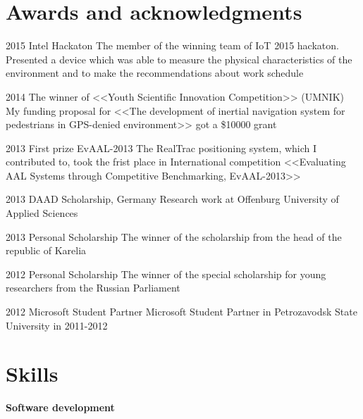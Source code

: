 \documentclass{tccv}
\begin{document}
\section{Awards and acknowledgments}

\begin{yearlist}
\item {2015}
     {Intel Hackaton}
     {The member of the winning team of IoT
2015 hackaton. Presented a device which was able to measure the physical characteristics of the environment and to make the recommendations about work schedule}

\item{2014}
     {The winner of <<Youth Scientific Innovation
Competition>> (UMNIK)}
     {My funding proposal for <<The
development of inertial navigation system for pedestrians
in GPS-denied environment>> got a \$10000 grant}

\end{yearlist}

\begin{yearlist}
\item{2013}
     {First prize EvAAL-2013}
     {The RealTrac positioning system, which I contributed to, took the frist place in International competition <<Evaluating AAL Systems through Competitive Benchmarking, EvAAL-2013>>}

\item{2013}
     {DAAD Scholarship, Germany}
     {Research work at Offenburg University of Applied Sciences}

\item{2013}
     {Personal Scholarship}
     {The winner of the scholarship from the head of the republic of Karelia}

\item{2012}
     {Personal Scholarship}
     {The winner of the special scholarship for young researchers from the Russian Parliament}

\item{2012}
     {Microsoft Student Partner}
     {Microsoft Student Partner in Petrozavodsk State University in 2011-2012}
\end{yearlist}

\newpage
\onecolumn
\section{Skills}

{\large{\textbf{Software development}}}
\vspace{1em}
\end{document}

